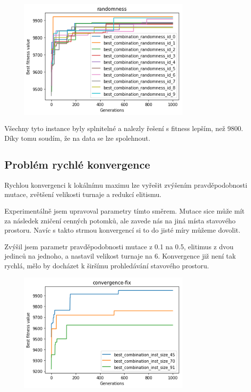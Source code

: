 \documentclass[a4paper,10pt,twocolumn]{article}
\begin{document}
\begin{itemize}
\begin{itemize}
\begin{figure}[H]
  \begin{center}
    \includegraphics[height=6cm]{graphs/randomness.png}
  \end{center}
\end{figure}


Všechny tyto instance byly splnitelné a nalezly řešení s fitness lepším, než 9800. Díky tomu soudím, že na data se lze spolehnout.

\subsection{Problém rychlé konvergence}


Rychlou konvergenci k lokálnímu maximu lze vyřešit zvýšením pravděpodobnosti mutace, zvětšení velikosti turnaje a redukcí elitismu.

Experimentálně jsem upravoval parametry tímto směrem. Mutace sice může mít za následek zničení cenných potomků, ale zavede nás na jiná místa stavového prostoru. Navíc s takto strmou konvergencí si to do jisté míry můžeme dovolit.

Zvýšil jsem parametr pravděpodobnosti mutace z 0.1 na 0.5, elitimus z dvou jedinců na jednoho, a nastavil velikost turnaje na 6. Konvergence již není tak rychlá, mělo by docházet k širšímu prohledávání stavového prostoru.



\begin{figure}[H]
  \begin{center}
    \includegraphics[height=6cm]{graphs/convergence-fix.png}
  \end{center}
\end{figure}





\end{itemize}
\end{itemize}
\end{document}
